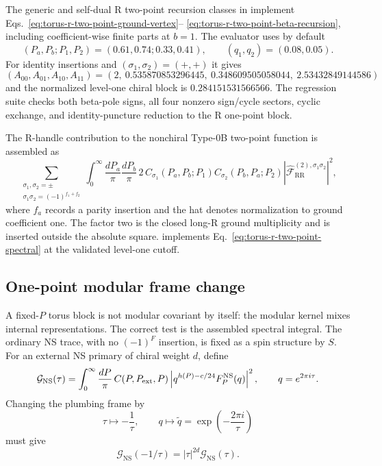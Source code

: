 \documentclass[11pt]{article}
\newcommand{\NS}{\mathrm{NS}}
\newcommand{\R}{\mathrm{R}}
\newcommand{\F}{\mathcal F}
\begin{document}
The generic and self-dual R two-point recursion classes in
 implement
Eqs.~\eqref{eq:torus-r-two-point-ground-vertex}--
\eqref{eq:torus-r-two-point-beta-recursion}, including coefficient-wise
finite parts at $b=1$.  The evaluator
 uses by default
\[
 (P_a,P_b;P_1,P_2)=(0.61,0.74;0.33,0.41),\qquad
 (q_1,q_2)=(0.08,0.05).
\]
For identity insertions and $(\sigma_1,\sigma_2)=(+,+)$ it gives
\[
 (A_{00},A_{01},A_{10},A_{11})
 =(2,\ 0.535870853296445,\ 0.348609505058044,\
 2.53432849144586)
\]
and the normalized level-one chiral block is
$0.284151531566566$.  The regression suite checks both beta-pole signs, all
four nonzero sign/cycle sectors, cyclic exchange, and identity-puncture
reduction to the R one-point block.

The R-handle contribution to the nonchiral Type-0B two-point function is
assembled as
\begin{equation}
 \sum_{\substack{\sigma_1,\sigma_2=\pm\\
       \sigma_1\sigma_2=(-1)^{f_1+f_2}}}
 \int_0^\infty\frac{dP_a}{\pi}\frac{dP_b}{\pi}\,
 2\,C_{\sigma_1}(P_a,P_b;P_1)
 C_{\sigma_2}(P_b,P_a;P_2)
 \left|\widehat{\F}_{\R\R}^{(2),\sigma_1\sigma_2}\right|^2,
\label{eq:torus-r-two-point-spectral}
\end{equation}
where $f_a$ records a parity insertion and the hat denotes normalization to
ground coefficient one.  The factor two is the closed long-R ground
multiplicity and is inserted outside the absolute square.
 implements
Eq.~\eqref{eq:torus-r-two-point-spectral} at the validated level-one cutoff.

\subsection{One-point modular frame change}
\label{sec:torus-one-point-modular}

A fixed-$P$ torus block is not modular covariant by itself: the modular
kernel mixes internal representations.  The correct test is the assembled
spectral integral.  The ordinary NS trace, with no $(-1)^F$ insertion, is
fixed as a spin structure by $S$.  For an external NS primary of chiral
weight $d$, define
\begin{equation}
 \mathcal G_{\NS}(\tau)
 =\int_0^\infty\frac{dP}{\pi}\,
 C(P,P_{\rm ext},P)
 \left|
 q^{h(P)-c/24}F_P^{\NS}(q)
 \right|^2,
 \qquad q=e^{2\pi i\tau}.
 \label{eq:torus-one-point-full-ns}
\end{equation}
Changing the plumbing frame by
\begin{equation}
 \tau\longmapsto-\frac1\tau,\qquad
 q\longmapsto\widetilde q
 =\exp\left(-\frac{2\pi i}{\tau}\right)
 \label{eq:torus-q-qtilde}
\end{equation}
must give
\begin{equation}
 \mathcal G_{\NS}(-1/\tau)
 =|\tau|^{2d}\mathcal G_{\NS}(\tau).
 \label{eq:torus-one-point-modular-law}
\end{equation}
\end{document}
